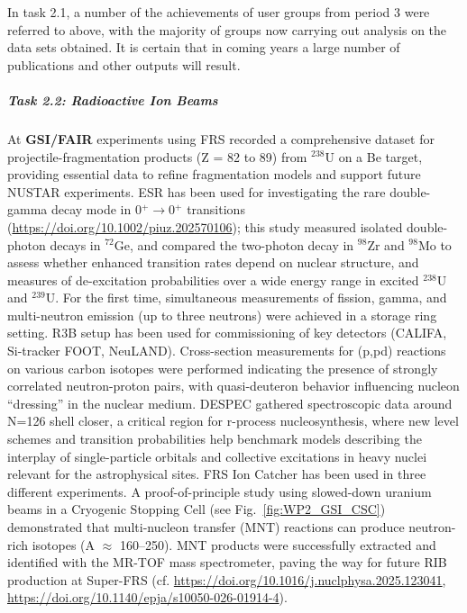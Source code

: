In task 2.1, a number of the achievements of user groups from period 3 were referred to above, with the majority of groups now carrying out analysis on the data sets obtained. It is certain that in coming years a large number of publications and other outputs will result. 






\subparagraph{Task 2.2: Radioactive Ion Beams} \mbox{}

At \textbf{GSI/FAIR} experiments using FRS recorded a comprehensive dataset for projectile-fragmentation products (Z = 82 to 89) from $^{238}$U on a Be target, providing essential data to refine fragmentation models and support future NUSTAR experiments. 
ESR has been used for investigating the rare double-gamma decay mode in 0$^+$$\rightarrow$0$^+$ transitions (\url{https://doi.org/10.1002/piuz.202570106}); this study measured isolated double-photon decays in $^{72}$Ge, and compared the two-photon decay in $^{98}$Zr and $^{98}$Mo to assess whether enhanced transition rates depend on nuclear structure, and measures of de-excitation probabilities over a wide energy range in excited $^{238}$U and $^{239}$U. 
For the first time, simultaneous measurements of fission, gamma, and multi-neutron emission (up to three neutrons) were achieved in a storage ring setting. R3B setup has been used for commissioning of key detectors (CALIFA, Si-tracker FOOT, NeuLAND). Cross-section measurements for (p,pd) reactions on various carbon isotopes were performed indicating the presence of strongly correlated neutron-proton pairs, with quasi-deuteron behavior influencing nucleon “dressing” in the nuclear medium. 
DESPEC gathered spectroscopic data around N=126 shell closer, a critical region for r-process nucleosynthesis, where new level schemes and transition probabilities help benchmark models describing the interplay of single-particle orbitals and collective excitations in heavy nuclei relevant for the astrophysical sites. 
FRS Ion Catcher has been used in three different experiments. A proof-of-principle study using slowed-down uranium beams in a Cryogenic Stopping Cell (see Fig.~\ref{fig:WP2_GSI_CSC}) demonstrated that multi-nucleon transfer (MNT) reactions can produce neutron-rich isotopes (A $\approx$ 160–250). MNT products were successfully extracted and identified with the MR-TOF mass spectrometer, paving the way for future RIB production at Super-FRS (cf. \url{https://doi.org/10.1016/j.nuclphysa.2025.123041}, \url{https://doi.org/10.1140/epja/s10050-026-01914-4}). 

